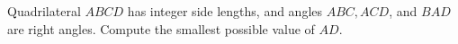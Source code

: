 Quadrilateral $ABCD$ has integer side lengths, and angles $ABC, ACD$, and $BAD$ are right angles. Compute the smallest possible value of $AD$.